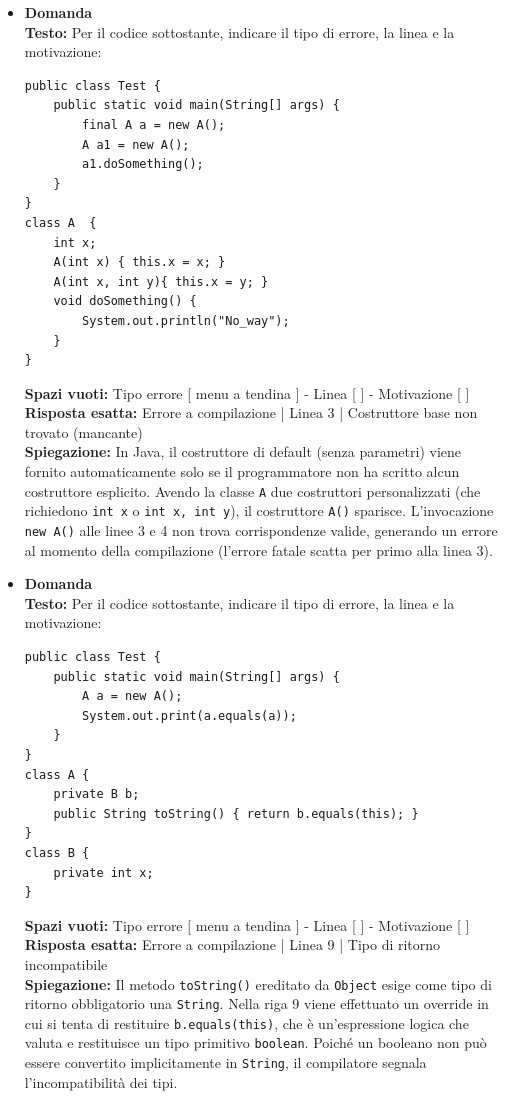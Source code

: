 \documentclass[12pt, a4paper]{article}
\begin{document}
\begin{itemize}
    \item {}\textbf{Domanda \thedomanda} \\
    \textbf{Testo:} Per il codice sottostante, indicare il tipo di errore, la linea e la motivazione:
\begin{verbatim}
public class Test {
    public static void main(String[] args) {
        final A a = new A();
        A a1 = new A();
        a1.doSomething();
    }
}
class A  {
    int x;
    A(int x) { this.x = x; }
    A(int x, int y){ this.x = y; }
    void doSomething() {
        System.out.println("No_way");
    }
}
\end{verbatim}
    \textbf{Spazi vuoti:} Tipo errore [ menu a tendina ] - Linea [ \hspace{1cm} ] - Motivazione [ \hspace{1cm} ] \\
    \textbf{Risposta esatta:} Errore a compilazione | Linea 3 | Costruttore base non trovato (mancante) \\
    \textbf{Spiegazione:} In Java, il costruttore di default (senza parametri) viene fornito automaticamente solo se il programmatore non ha scritto alcun costruttore esplicito. Avendo la classe \texttt{A} due costruttori personalizzati (che richiedono \texttt{int x} o \texttt{int x, int y}), il costruttore \texttt{A()} sparisce. L'invocazione \texttt{new A()} alle linee 3 e 4 non trova corrispondenze valide, generando un errore al momento della compilazione (l'errore fatale scatta per primo alla linea 3).
    \vspace{0.5cm}

    \item {}\textbf{Domanda \thedomanda} \\
    \textbf{Testo:} Per il codice sottostante, indicare il tipo di errore, la linea e la motivazione:
\begin{verbatim}
public class Test {
    public static void main(String[] args) {
        A a = new A();
        System.out.print(a.equals(a));
    }
}
class A {
    private B b;
    public String toString() { return b.equals(this); }
}
class B {
    private int x;
}
\end{verbatim}

\newpage

    \textbf{Spazi vuoti:} Tipo errore [ menu a tendina ] - Linea [ \hspace{1cm} ] - Motivazione [ \hspace{1cm} ] \\
    \textbf{Risposta esatta:} Errore a compilazione | Linea 9 | Tipo di ritorno incompatibile \\
    \textbf{Spiegazione:} Il metodo \texttt{toString()} ereditato da \texttt{Object} esige come tipo di ritorno obbligatorio una \texttt{String}. Nella riga 9 viene effettuato un override in cui si tenta di restituire \texttt{b.equals(this)}, che è un'espressione logica che valuta e restituisce un tipo primitivo \texttt{boolean}. Poiché un booleano non può essere convertito implicitamente in \texttt{String}, il compilatore segnala l'incompatibilità dei tipi.


\end{itemize}
\end{document}
